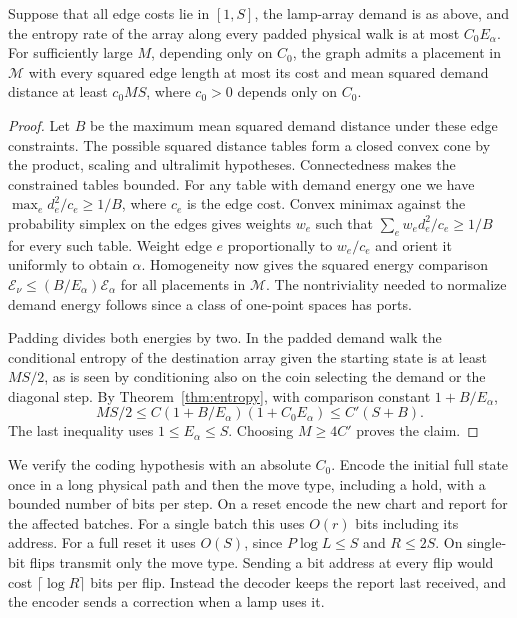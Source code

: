 \begin{lemma}\label{lamp:entropy-placement}
Suppose that all edge costs lie in \([1,S]\), the lamp-array demand
is as above, and the entropy rate of the array along every padded
physical walk is at most \(C_0 E_\alpha\). For sufficiently large
\(M\), depending only on \(C_0\), the graph admits a placement in
\(\mathcal M\) with every squared edge length at most its cost and
mean squared demand distance at least \(c_0 MS\), where
\(c_0>0\) depends only on \(C_0\).
\end{lemma}
\begin{proof}
Let \(B\) be the maximum mean squared demand distance under these edge
constraints. The possible squared distance tables form a closed convex
cone by the product, scaling and ultralimit hypotheses. Connectedness
makes the constrained tables bounded. For any table with demand
energy one we have \(\max_e d_e^2/c_e\ge1/B\), where \(c_e\) is the
edge cost. Convex minimax against the probability simplex on the
edges gives weights \(w_e\) such that
\(\sum_e w_e d_e^2/c_e\ge1/B\) for every such table.
Weight edge \(e\) proportionally to \(w_e/c_e\) and orient it uniformly
to obtain \(\alpha\). Homogeneity now gives the squared energy comparison
\(\mathcal E_\nu\le(B/E_\alpha)\mathcal E_\alpha\) for all placements
in \(\mathcal M\). The nontriviality needed to normalize demand energy
follows since a class of one-point spaces has ports.

Padding divides both energies by two. In the padded demand walk the
conditional entropy of the destination array given the starting state is
at least \(MS/2\), as is seen by conditioning also on the coin selecting
the demand or the diagonal step. By Theorem~\ref{thm:entropy}, with comparison constant \(1+B/E_\alpha\),
\[
 MS/2\le C(1+B/E_\alpha)(1+C_0 E_\alpha)\le C'(S+B).
\]
The last inequality uses \(1\le E_\alpha\le S\). Choosing \(M\ge4C'\)
proves the claim.
\end{proof}

We verify the coding hypothesis with an absolute \(C_0\). Encode the
initial full state once in a long physical path and then the move type,
including a hold, with a bounded number of bits per step. On a reset
encode the new chart and report for the affected batches. For a single
batch this uses \(O(r)\) bits including its address. For a full reset it
uses \(O(S)\), since \(P\log L\le S\) and \(R\le2S\).
On single-bit flips transmit only the move type. Sending a bit address
at every flip would cost \(\lceil\log R\rceil\) bits per flip. Instead
the decoder keeps the report last received, and the encoder sends a
correction when a lamp uses it.

